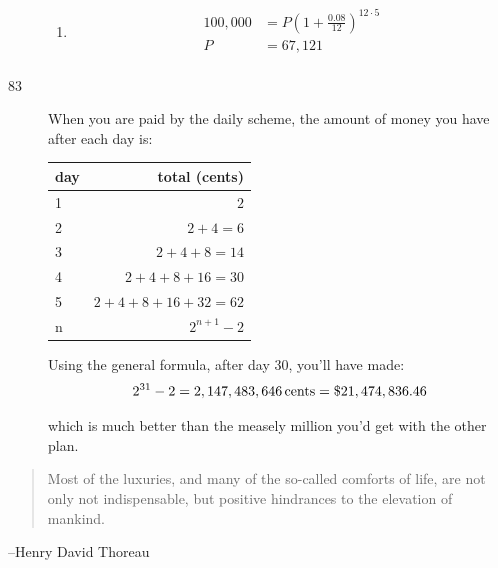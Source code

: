 \documentclass{exam}
\begin{document}
\begin{description}
\begin{enumerate}[a]
          \item 
            \begin{align*}
              100,000 &= P  \left( 1 + \frac{0.08}{12} \right)^{12 \cdot 5} \\
              P       &= 67,121 \\
            \end{align*}
        \end{enumerate}

      \item[83]
        When you are paid by the daily scheme, the amount of money you have after each day is:

        \begin{tabular}[H]{lr}
          \toprule
          day  & total (cents) \\
          \midrule
          1 & $2$ \\
          2 & $2 + 4 = 6$ \\
          3 & $2 + 4 + 8 = 14$ \\
          4 & $2 + 4 + 8 + 16 = 30$ \\
          5 & $2 + 4 + 8 + 16 + 32 = 62$ \\
          n & $2^{n + 1} - 2$ \\
          \bottomrule
        \end{tabular}

        Using the general formula, after day 30, you'll have made:
        \[
          2^{31} - 2 = \unit[2,147,483,646]{cents} = \$21,474,836.46
        \]

        which is much better than the measely million you'd get with the other plan.
    \end{description}

  \else
    \vspace{6 cm}
    \begin{quote}
      \begin{em}
        Most of the luxuries, and many of the so-called comforts of life, are not only not indispensable, but positive
        hindrances to the elevation of mankind.  
      \end{em}
    \end{quote}

    \hspace{1 cm} --Henry David Thoreau
  \fi
\end{document}
